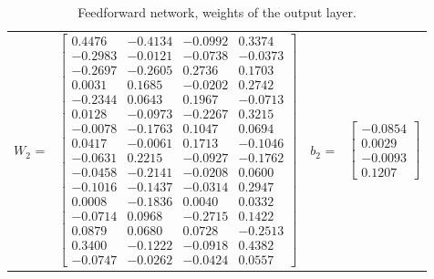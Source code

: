 \documentclass[algorithms,article,submit,pdftex,moreauthors]{Definitions/mdpi}
\begin{document}
\begin{table}[ht]
	\centering
	\caption{Feedforward network, weights of the output layer.}
	\label{tab:matW2b2}
	
	\begin{tabular}{rlrl}  
		$W_2$ = & 
		$
	\begin{bmatrix}
	0.4476 & -0.4134 & -0.0992 &  0.3374 \\
	-0.2983 & -0.0121 & -0.0738 & -0.0373 \\
	-0.2697 & -0.2605 &  0.2736 &  0.1703 \\
	0.0031 &  0.1685 & -0.0202 &  0.2742 \\
	-0.2344 &  0.0643 &  0.1967 & -0.0713 \\
	0.0128 & -0.0973 & -0.2267 &  0.3215 \\
	-0.0078 & -0.1763 &  0.1047 &  0.0694 \\
	0.0417 & -0.0061 &  0.1713 & -0.1046 \\
	-0.0631 &  0.2215 & -0.0927 & -0.1762 \\
	-0.0458 & -0.2141 & -0.0208 &  0.0600 \\
	-0.1016 & -0.1437 & -0.0314 &  0.2947 \\
	0.0008 & -0.1836 &  0.0040 &  0.0332 \\
	-0.0714 &  0.0968 & -0.2715 &  0.1422 \\
	0.0879 &  0.0680 &  0.0728 & -0.2513 \\
	0.3400 & -0.1222 & -0.0918 &  0.4382 \\
	-0.0747 & -0.0262 & -0.0424 &  0.0557
\end{bmatrix}
		$
		&
		$b_2$ = &
		$
		\begin{bmatrix}
			-0.0854 \\ 0.0029 \\ -0.0093 \\ 0.1207
		\end{bmatrix}
		$
	\end{tabular}	
\end{table}



\end{document}
